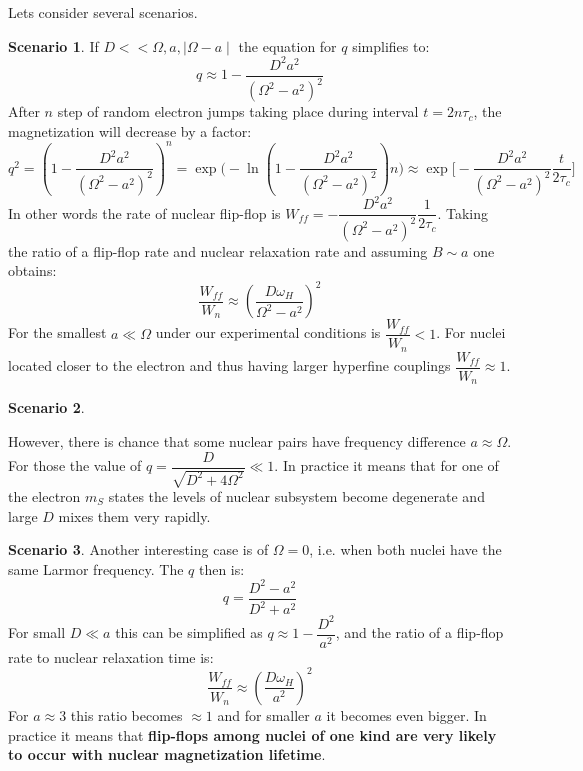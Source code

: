 \documentclass[a4paper, 12pt]{article}
\begin{document}
Lets consider several scenarios.

\textbf{Scenario 1}.
If $D<<\Omega, a, \mid \Omega - a \mid  $ the equation for $q$ simplifies to:
\begin{equation}
  q \approx 1 - \dfrac{D^2 a^2}{(\Omega^2 - a^2)^2}
\end{equation}
 After $n$ step of random electron jumps taking place during interval $t = 2 n \tau_c $, the magnetization will decrease by a factor:
 \begin{equation}
    q^2 = (1 - \dfrac{D^2 a^2}{(\Omega^2 - a^2)^2} )^n  = \exp \Big(-\ln (1 - \dfrac{D^2 a^2}{(\Omega^2 - a^2)^2}) n \Big) \approx \exp \Big[-\dfrac{D^2 a^2}{(\Omega^2 - a^2)^2} \dfrac{t}{ 2\tau_c} \Big]
 \end{equation}
 In other words the rate of nuclear flip-flop is $W_{ff} = -\dfrac{D^2 a^2}{(\Omega^2 - a^2)^2} \dfrac{1}{ 2\tau_c} $. Taking the ratio of a flip-flop rate and nuclear relaxation rate and assuming $B  \sim a$ one obtains:
 \begin{equation}
    \dfrac{W_{ff}}{W_n} \approx ( \dfrac{D \omega_H}{\Omega^2 - a^2} )^2
 \end{equation}
 For the smallest $a \ll \Omega$ under our experimental conditions is $ \dfrac{W_{ff}}{W_n} < 1$. For nuclei located closer to the electron and thus having larger hyperfine couplings $ \dfrac{W_{ff}}{W_n} \approx 1$. 
 
\textbf{Scenario 2}.

However, there is chance that some nuclear pairs have frequency difference  $a \approx \Omega$. For those the value of $q = \dfrac{D}{\sqrt{D^2 + 4 \Omega ^2}} \ll 1$. In practice it means that for one of the electron $m_S$ states the levels of nuclear subsystem become degenerate and large $D$ mixes them very rapidly.

\textbf{Scenario 3}.
Another interesting case is of $\Omega = 0$, i.e. when both nuclei have the same Larmor frequency. The $q$  then is:
\begin{equation}
  q = \dfrac{D^2 - a^2 }{D^2 + a^2}
\end{equation}
For small $D \ll a$ this can be simplified as $q \approx 1 - \dfrac{D^2}{a^2}$, and the ratio of a flip-flop rate to nuclear relaxation time is:
\begin{equation}
    \dfrac{W_{ff}}{W_n} \approx ( \dfrac{D \omega_H}{a^2} )^2
\end{equation}
For $a \approx 3$ this ratio becomes $\approx 1$ and for smaller $a$ it becomes even bigger. In practice it means that \textbf{flip-flops among nuclei of one kind are very likely to occur with nuclear magnetization lifetime}.
\end{document}
